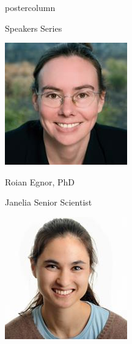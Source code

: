 \documentclass{beamer}
\begin{document}
\begin{frame}
\begin{columns}
\begin{column}{.33\textwidth}
\begin{beamercolorbox}[center,wd=\textwidth]{postercolumn}
\begin{minipage}[T]{.95\textwidth}
{\begin{myblock}{Speakers Series}
\begin{addmargin}[1em]{1em}
\begin{minipage}{0.4\linewidth}
                    \includegraphics[width=\linewidth]{img/roian.jpg}
                    \centerline{Roian Egnor, PhD}\newline
                    \centerline{Janelia Senior Scientist}
                \end{minipage}
                \hspace{0.75cm}
                \begin{minipage}{0.4\linewidth}
                    \includegraphics[width=\linewidth]{img/kristin.jpg}

\end{minipage}
\end{addmargin}
\end{myblock}}
\end{minipage}
\end{beamercolorbox}
\end{column}
\end{columns}
\end{frame}
\end{document}
